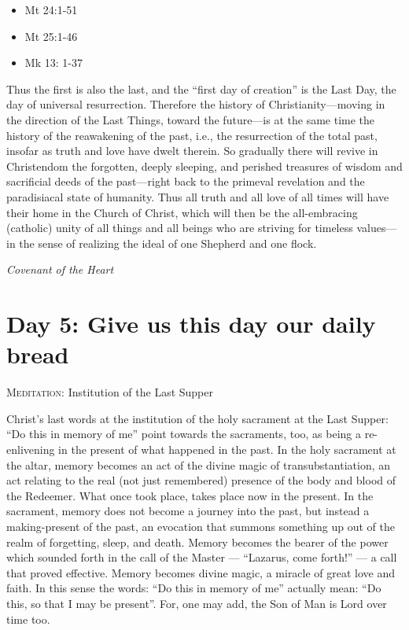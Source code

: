 \begin{itemize}
\item Mt 24:1-51 
\item Mt 25:1-46 
\item Mk 13: 1-37 
\end{itemize}
\begin{quotex}
Thus the first is also the last, and the “first day of creation” is the Last Day, the day of universal resurrection.
Therefore the history of Christianity—moving in the direction of the Last Things, toward the
future—is at the same time the history of the reawakening of the past, i.e., the resurrection of
the total past, insofar as truth and love have dwelt therein. So gradually there will revive in Christendom the
forgotten, deeply sleeping, and perished treasures of wisdom and sacrificial deeds of the
past—right back to the primeval revelation and the paradisiacal state of humanity. Thus all truth
and all love of all times will have their home in the Church of Christ, which will then be the all-embracing (catholic)
unity of all things and all beings who are striving for timeless values—in the sense of realizing
the ideal of one Shepherd and one flock. 

\begin{flushright}\textit{Covenant of the Heart}\end{flushright}

\end{quotex}

\section{Day 5: Give us this day our daily bread}
\textsc{Meditation}: Institution of the Last Supper

\begin{quotationx}
Christ's last words at the institution of the holy sacrament at the Last Supper: “Do this in memory
of me” point towards the sacraments, too, as being a re-enlivening in the present of what happened in the past. In the
holy sacrament at the altar, memory becomes an act of the divine magic of transubstantiation, an act relating to the
real (not just remembered) presence of the body and blood of the Redeemer. What once took place, takes place now in the
present. In the sacrament, memory does not become a journey into the past, but instead a making-present of the past, an
evocation that summons something up out of the realm of forgetting, sleep, and death. Memory becomes the bearer of the
power which sounded forth in the call of the Master — “Lazarus, come forth!”
— a call that proved effective. Memory becomes divine magic, a miracle of great love and faith. In
this sense the words: “Do this in memory of me” actually mean: “Do this, so that I may be present”. For, one may add,
the Son of Man is Lord over time too. 


\end{quotationx}

